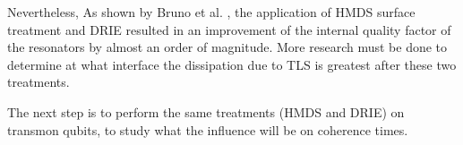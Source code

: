 \documentclass[12pt]{report}
\begin{document}
Nevertheless, As shown by Bruno et al. \cite{DRIE}, the application of HMDS surface treatment and DRIE resulted in an improvement of the internal quality factor of the resonators by almost an order of magnitude. More research must be done to determine at what interface the dissipation due to TLS is greatest after these two treatments.

The next step is to perform the same treatments (HMDS and DRIE) on transmon qubits, to study what the influence will be on coherence times.






















\newcommand{\vrms}{\text{v}_\text{n}^\text{rms}}
\newcommand{\vsq}{\overline{\text{v}_\text{n}^2}}
\newcommand{\vn}{\text{v}_\text{n}}
\newcommand{\vin}{\text{v}_\text{in}}
\newcommand{\vout}{\text{v}_\text{out}}
\newcommand{\Sin}{\text{S}_{\vn}^\text{in}}
\newcommand{\Sout}{\text{S}_{\vn}^\text{out}}
\newcommand{\Svn}{\text{S}_{\vn}}
\end{document}
